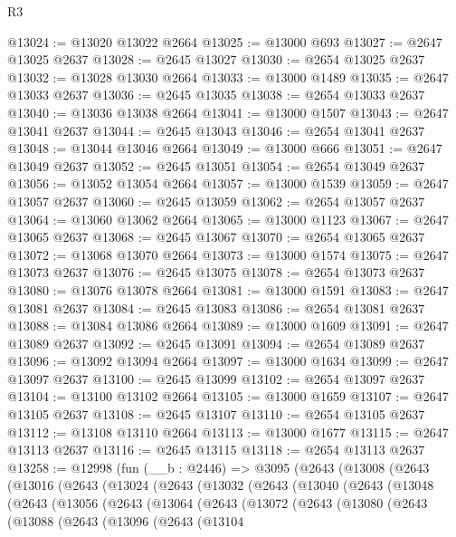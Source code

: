 \begin{lexlean}{R3}
\begin{coremodule}
@13024 := @13020 @13022 @2664
@13025 := @13000 @693
@13027 := @2647 @13025 @2637
@13028 := @2645 @13027
@13030 := @2654 @13025 @2637
@13032 := @13028 @13030 @2664
@13033 := @13000 @1489
@13035 := @2647 @13033 @2637
@13036 := @2645 @13035
@13038 := @2654 @13033 @2637
@13040 := @13036 @13038 @2664
@13041 := @13000 @1507
@13043 := @2647 @13041 @2637
@13044 := @2645 @13043
@13046 := @2654 @13041 @2637
@13048 := @13044 @13046 @2664
@13049 := @13000 @666
@13051 := @2647 @13049 @2637
@13052 := @2645 @13051
@13054 := @2654 @13049 @2637
@13056 := @13052 @13054 @2664
@13057 := @13000 @1539
@13059 := @2647 @13057 @2637
@13060 := @2645 @13059
@13062 := @2654 @13057 @2637
@13064 := @13060 @13062 @2664
@13065 := @13000 @1123
@13067 := @2647 @13065 @2637
@13068 := @2645 @13067
@13070 := @2654 @13065 @2637
@13072 := @13068 @13070 @2664
@13073 := @13000 @1574
@13075 := @2647 @13073 @2637
@13076 := @2645 @13075
@13078 := @2654 @13073 @2637
@13080 := @13076 @13078 @2664
@13081 := @13000 @1591
@13083 := @2647 @13081 @2637
@13084 := @2645 @13083
@13086 := @2654 @13081 @2637
@13088 := @13084 @13086 @2664
@13089 := @13000 @1609
@13091 := @2647 @13089 @2637
@13092 := @2645 @13091
@13094 := @2654 @13089 @2637
@13096 := @13092 @13094 @2664
@13097 := @13000 @1634
@13099 := @2647 @13097 @2637
@13100 := @2645 @13099
@13102 := @2654 @13097 @2637
@13104 := @13100 @13102 @2664
@13105 := @13000 @1659
@13107 := @2647 @13105 @2637
@13108 := @2645 @13107
@13110 := @2654 @13105 @2637
@13112 := @13108 @13110 @2664
@13113 := @13000 @1677
@13115 := @2647 @13113 @2637
@13116 := @2645 @13115
@13118 := @2654 @13113 @2637
@13258 := @12998
    (fun (__b : @2446) =>
    @3095
      (@2643
        (@13008
          (@2643
            (@13016
              (@2643
                (@13024
                  (@2643
                    (@13032
                      (@2643
                        (@13040
                          (@2643
                            (@13048
                              (@2643
                                (@13056
                                  (@2643
                                    (@13064
                                      (@2643
                                        (@13072
                                          (@2643
                                            (@13080
                                              (@2643
                                                (@13088
                                                  (@2643
                                                    (@13096
                                                      (@2643
                                                        (@13104

\end{coremodule}
\end{lexlean}
